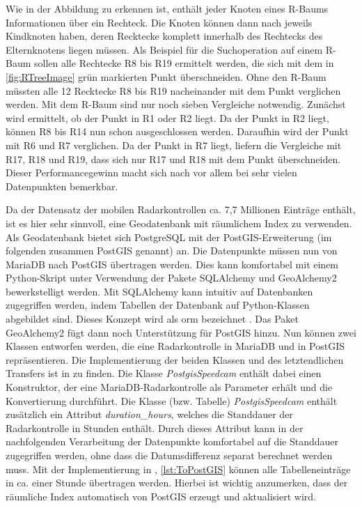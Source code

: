 Wie in der Abbildung zu erkennen ist, enthält jeder Knoten eines R-Baums Informationen über ein Rechteck.
Die Knoten können dann nach \cite{RTrees} jeweils Kindknoten haben, deren Recktecke komplett innerhalb des Rechtecks des Elternknotens liegen müssen.
Als Beispiel für die Suchoperation auf einem R-Baum sollen alle Rechtecke R8 bis R19 ermittelt werden, die sich mit dem in \autoref{fig:RTreeImage} grün markierten Punkt überschneiden.
Ohne den R-Baum müssten alle 12 Recktecke R8 bis R19 nacheinander mit dem Punkt verglichen werden.
Mit dem R-Baum sind nur noch sieben Vergleiche notwendig.
Zunächst wird ermittelt, ob der Punkt in R1 oder R2 liegt.
Da der Punkt in R2 liegt, können R8 bis R14 nun schon ausgeschlossen werden.
Daraufhin wird der Punkt mit R6 und R7 verglichen.
Da der Punkt in R7 liegt, liefern die Vergleiche mit R17, R18 und R19, dass sich nur R17 und R18 mit dem Punkt überschneiden.
Dieser Performancegewinn macht sich nach \cite{RTrees} vor allem bei sehr vielen Datenpunkten bemerkbar.

Da der Datensatz der mobilen Radarkontrollen ca. 7,7 Millionen Einträge enthält, ist es hier sehr sinnvoll, eine Geodatenbank mit räumlichem Index zu verwenden.
Als Geodatenbank bietet sich PostgreSQL mit der PostGIS-Erweiterung (im folgenden zusammen PostGIS genannt) an.
Die Datenpunkte müssen nun von MariaDB nach PostGIS übertragen werden.
Dies kann komfortabel mit einem Python-Skript unter Verwendung der Pakete SQLAlchemy und GeoAlchemy2 bewerkstelligt werden.
Mit SQLAlchemy kann intuitiv auf Datenbanken zugegriffen werden, indem Tabellen der Datenbank auf Python-Klassen abgebildet sind.
Dieses Konzept wird als \acrfull{orm} bezeichnet \cite{SQLAlchemyKeyFeatures}.
Das Paket GeoAlchemy2 fügt dann noch Unterstützung für PostGIS hinzu.
Nun können zwei Klassen entworfen werden, die eine Radarkontrolle in MariaDB und in PostGIS repräsentieren.
Die Implementierung der beiden Klassen und des letztendlichen Transfers ist in  zu finden.
Die Klasse \emph{PostgisSpeedcam} enthält dabei einen Konstruktor, der eine MariaDB-Radarkontrolle als Parameter erhält und die Konvertierung durchführt.
Die Klasse (bzw. Tabelle) \emph{PostgisSpeedcam} enthält zusätzlich ein Attribut \emph{duration\_hours}, welches die Standdauer der Radarkontrolle in Stunden enthält.
Durch dieses Attribut kann in der nachfolgenden Verarbeitung der Datenpunkte komfortabel auf die Standdauer zugegriffen werden, ohne dass die Datumsdifferenz separat berechnet werden muss.
Mit der Implementierung in , \autoref{lst:ToPostGIS} können alle Tabelleneinträge in ca. einer Stunde übertragen werden.
Hierbei ist wichtig anzumerken, dass der räumliche Index automatisch von PostGIS erzeugt und aktualisiert wird.

